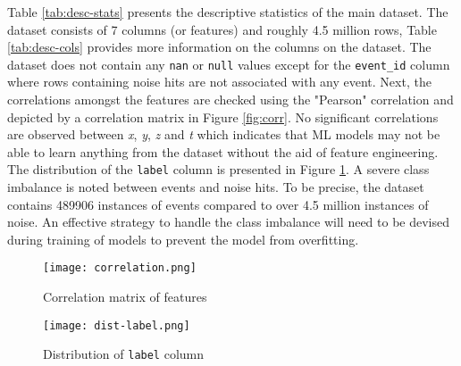 Table \ref{tab:desc-stats} presents the descriptive statistics of the
main dataset. The dataset consists of 7 columns (or features) and
roughly 4.5 million rows, Table \ref{tab:desc-cols} provides more
information on the columns on the dataset. The dataset does not
contain any \texttt{nan} or \texttt{null} values except for the
\texttt{event\_id} column where rows containing noise hits are not
associated with any event. Next, the correlations amongst the features
are checked using the "Pearson" correlation and depicted by a
correlation matrix in Figure \ref{fig:corr}. No significant
correlations are observed between \emph{x}, \emph{y}, \emph{z} and
\emph{t} which indicates that ML models may not be able to learn
anything from the dataset without the aid of feature engineering. The
distribution of the \texttt{label} column is presented in Figure
\ref{fig:dist-label}. A severe class imbalance is noted between events
and noise hits. To be precise, the dataset contains 489906 instances
of events compared to over 4.5 million instances of noise. An
effective strategy to handle the class imbalance will need to be
devised during training of models to prevent the model from
overfitting.

\begin{figure}[htb]
  \begin{minipage}[t]{0.64\textwidth}
  \centering
  \texttt{[image: correlation.png]}
  \caption{Correlation matrix of features}
  \label{fig:corr}    
  \end{minipage}
  \begin{minipage}[t]{0.34\textwidth}
  \centering
  \texttt{[image: dist-label.png]}
  \caption{Distribution of \texttt{label} column}%
  \label{fig:dist-label}    
  \end{minipage}
\end{figure}

